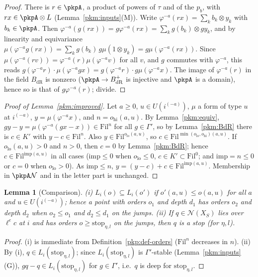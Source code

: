 \documentclass[10pt]{amsart}
\newtheorem{lemma}[theorem]{Lemma}
\theoremstyle{definition}
\theoremstyle{remark}
\begin{document}
\begin{proof}
There is $r\in\pkpA$, a product of powers of $\tau$ and of the $p_b$, with $rx\in\pkpA\otimes L$
(Lemma~\ref{pkm:inputs}(M)). Write $\varphi^{-a}(rx)=\sum_kb_k\otimes y_k$ with $b_k\in\pkpA$. Then
$\varphi^{-a}(g(rx))=g\varphi^{-a}(rx)=\sum_k g(b_k)\otimes gy_k$, and by linearity and equivariance
$\mu(\varphi^{-a}g(rx))=\sum_kg(b_k)\,g\mu(1\otimes y_k)=g\mu(\varphi^{-a}(rx))$. Since
$\mu(\varphi^{-a}(rv))=\varphi^{-a}(r)\mu(\varphi^{-a}v)$ for all $v$, and $g$ commutes with
$\varphi^{-a}$, this reads $g(\varphi^{-a}r)\cdot\mu(\varphi^{-a}gx)=g(\varphi^{-a}r)\cdot
g\mu(\varphi^{-a}x)$. The image of $\varphi^{-a}(r)$ in the field $B_{\mathrm{dR}}$ is nonzero
($\pkpA\to B^+_{\mathrm{dR}}$ is injective and $\pkpA$ is a domain), hence so is that of $g\varphi^{-a}(r)$;
divide.
\end{proof}

\begin{proof}[Proof of Lemma~\ref{pkm:improved}]
Let $a\ge0$, $u\in U(i^{(-a)})$, $\mu$ a form of type $u$ at $i^{(-a)}$, $y=\mu(\varphi^{-a}x)$, and
$n=o_{\mathrm{hi}}(a,u)$. By Lemma~\ref{pkm:equiv}, $gy-y=\mu(\varphi^{-a}(gx-x))\in\mathrm{Fil}^n$ for all
$g\in\Gamma'$, so by Lemma~\ref{pkm:BdR} there is $c\in K'$ with $y-c\in\mathrm{Fil}^n$. Also
$y\in\mathrm{Fil}^{o_{\mathrm{lo}}(a,u)}$, so $c\in\mathrm{Fil}^{\min(o_{\mathrm{lo}},o_{\mathrm{hi}})(a,u)}$.
If $o_{\mathrm{lo}}(a,u)>0$ and $n>0$, then $c=0$ by Lemma~\ref{pkm:BdR}; hence $c\in\mathrm{Fil}^{\mathrm{imp}(a,u)}$
in all cases ($\mathrm{imp}\le0$ when $o_{\mathrm{lo}}\le0$, $c\in K'\subset\mathrm{Fil}^0$; and
$\mathrm{imp}=n\le0$ or $c=0$ when $o_{\mathrm{lo}}>0$). As $\mathrm{imp}\le n$, $y=(y-c)+c\in
\mathrm{Fil}^{\mathrm{imp}(a,u)}$. Membership in $\pkpA\mathcal N$ and in the letter part is unchanged.
\end{proof}

\begin{lemma}[Comparison]\label{pkm:le}
(i) $L_i(o)\subseteq L_i(o')$ if $o'(a,u)\le o(a,u)$ for all $a$ and $u\in U(i^{(-a)})$; hence a point
with orders $o_1$ and depth $d_1$ has orders $o_2$ and depth $d_2$ when $o_2\le o_1$ and $d_2\le
d_1$ on the jumps. (ii) If $q\in\mathcal N(X_S)$ lies over $\ell^ec$ at $i$ and has orders $o\ge
\mathrm{stop}_{\eta,l}$ on the jumps, then $q$ is a stop (for $\eta,l$).
\end{lemma}

\begin{proof}
(i) is immediate from Definition~\ref{pkp:def-orders} ($\mathrm{Fil}^n$ decreases in $n$). (ii) By (i),
$q\in L_i(\mathrm{stop}_{\eta,l})$; since $L_i(\mathrm{stop}_{\eta,l})$ is $\Gamma'$-stable
(Lemma~\ref{pkm:inputs}(G)), $gq-q\in L_i(\mathrm{stop}_{\eta,l})$ for $g\in\Gamma'$, i.e.\ $q$ is deep
for $\mathrm{stop}_{\eta,l}$.
\end{proof}
\end{document}
